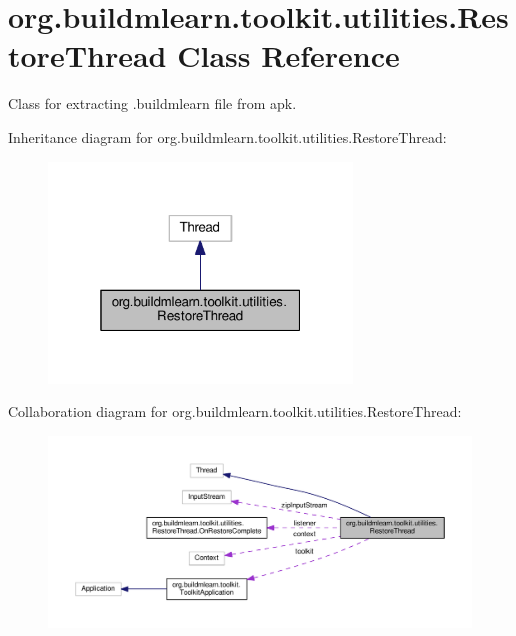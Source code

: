 \hypertarget{classorg_1_1buildmlearn_1_1toolkit_1_1utilities_1_1RestoreThread}{}\section{org.\+buildmlearn.\+toolkit.\+utilities.\+Restore\+Thread Class Reference}
\label{classorg_1_1buildmlearn_1_1toolkit_1_1utilities_1_1RestoreThread}


Class for extracting .buildmlearn file from apk.  




Inheritance diagram for org.\+buildmlearn.\+toolkit.\+utilities.\+Restore\+Thread\+:
\nopagebreak
\begin{figure}[H]
\begin{center}
\leavevmode
\includegraphics[width=229pt]{classorg_1_1buildmlearn_1_1toolkit_1_1utilities_1_1RestoreThread__inherit__graph}
\end{center}
\end{figure}


Collaboration diagram for org.\+buildmlearn.\+toolkit.\+utilities.\+Restore\+Thread\+:
\nopagebreak
\begin{figure}[H]
\begin{center}
\leavevmode
\includegraphics[width=350pt]{classorg_1_1buildmlearn_1_1toolkit_1_1utilities_1_1RestoreThread__coll__graph}
\end{center}
\end{figure}
